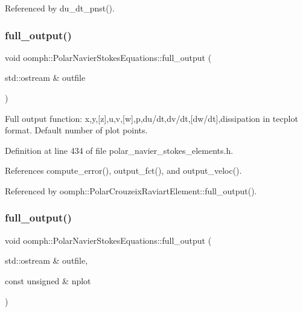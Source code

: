 Referenced by du\+\_\+dt\+\_\+pnst().

\mbox{\label{classoomph_1_1PolarNavierStokesEquations_abe241e9deab5ea6f3b4059a63c19ec3d}} 
\subsubsection{\texorpdfstring{full\+\_\+output()}{full\_output()}\hspace{0.1cm}{\footnotesize\ttfamily [1/2]}}
{\footnotesize\ttfamily void oomph\+::\+Polar\+Navier\+Stokes\+Equations\+::full\+\_\+output (\begin{DoxyParamCaption}\item[{std\+::ostream \&}]{outfile }\end{DoxyParamCaption})\hspace{0.3cm}{\ttfamily [inline]}}



Full output function\+: x,y,\mbox{[}z\mbox{]},u,v,\mbox{[}w\mbox{]},p,du/dt,dv/dt,\mbox{[}dw/dt\mbox{]},dissipation in tecplot format. Default number of plot points. 



Definition at line 434 of file polar\+\_\+navier\+\_\+stokes\+\_\+elements.\+h.



References compute\+\_\+error(), output\+\_\+fct(), and output\+\_\+veloc().



Referenced by oomph\+::\+Polar\+Crouzeix\+Raviart\+Element\+::full\+\_\+output().

\mbox{\label{classoomph_1_1PolarNavierStokesEquations_a51eb6471730901fdc5cccf2edbf2c870}} 
\subsubsection{\texorpdfstring{full\+\_\+output()}{full\_output()}\hspace{0.1cm}{\footnotesize\ttfamily [2/2]}}
{\footnotesize\ttfamily void oomph\+::\+Polar\+Navier\+Stokes\+Equations\+::full\+\_\+output (\begin{DoxyParamCaption}\item[{std\+::ostream \&}]{outfile,  }\item[{const unsigned \&}]{nplot }\end{DoxyParamCaption})}



